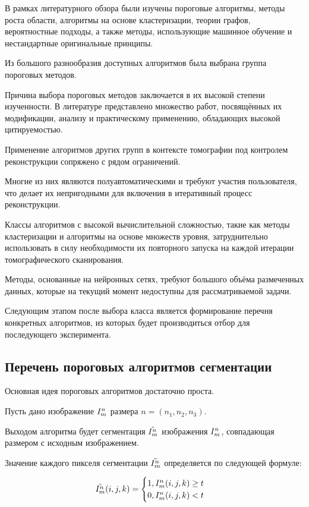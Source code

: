 В рамках литературного обзора были изучены пороговые алгоритмы, методы роста области, алгоритмы на основе кластеризации, теории графов, вероятностные подходы, а также методы, использующие машинное обучение и нестандартные оригинальные принципы.

Из большого разнообразия доступных алгоритмов была выбрана группа пороговых методов.

Причина выбора пороговых методов заключается в их высокой степени изученности. В литературе представлено множество работ, посвящённых их модификации, анализу и практическому применению, обладающих высокой цитируемостью.

Применение алгоритмов других групп в контексте томографии под контролем реконструкции сопряжено с рядом ограничений. 

Многие из них являются полуавтоматическими и требуют участия пользователя, что делает их непригодными для включения в итеративный процесс реконструкции. 

Классы алгоритмов с высокой вычислительной сложностью, такие как методы кластеризации и алгоритмы на основе множеств уровня, затруднительно использовать в силу необходимости их повторного запуска на каждой итерации томографического сканирования. 

Методы, основанные на нейронных сетях, требуют большого объёма размеченных данных, которые на текущий момент недоступны для рассматриваемой задачи.

Следующим этапом после выбора класса является формирование перечня конкретных алгоритмов, из которых будет производиться отбор для последующего эксперимента.

\subsection{Перечень пороговых алгоритмов сегментации}

Основная идея пороговых алгоритмов достаточно проста. 

Пусть дано изображение \(I^n_m\) размера \(n = (n_1, n_2, n_3)\).

Выходом алгоритма будет сегментация \(\tilde{I^n_m}\) изображения \(I^n_m\), совпадающая размером с исходным изображением.

Значение каждого пикселя сегментации \(\tilde{I^n_m}\) определяется по следующей формуле:

\begin{equation}
    \tilde{I^n_m} (i, j, k) = 
    \begin{cases}
        1, I^n_m(i, j, k) \geq t\\
        0, I^n_m(i, j, k) < t
    \end{cases}
\end{equation}

